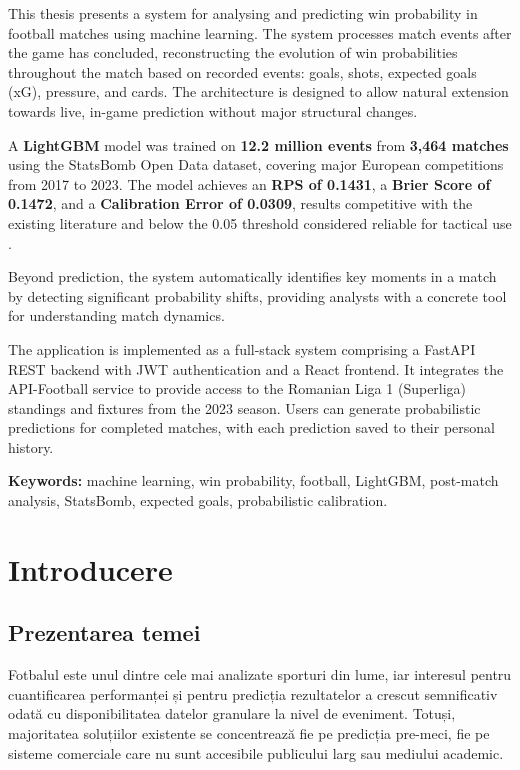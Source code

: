 This thesis presents a system for analysing and predicting win probability
in football matches using machine learning. The system processes match events
after the game has concluded, reconstructing the evolution of win probabilities
throughout the match based on recorded events: goals, shots, expected goals
(xG), pressure, and cards. The architecture is designed to allow natural
extension towards live, in-game prediction without major structural changes.

A \textbf{LightGBM} model was trained on \textbf{12.2 million events} from
\textbf{3,464 matches} using the StatsBomb Open Data dataset, covering major
European competitions from 2017 to 2023. The model achieves an
\textbf{RPS of 0.1431}, a \textbf{Brier Score of 0.1472}, and a
\textbf{Calibration Error of 0.0309}, results competitive with the
existing literature and below the 0.05 threshold considered reliable for
tactical use \cite{Robberechts2019}.

Beyond prediction, the system automatically identifies key moments in a
match by detecting significant probability shifts, providing analysts with
a concrete tool for understanding match dynamics.

The application is implemented as a full-stack system comprising a FastAPI
REST backend with JWT authentication and a React frontend. It integrates
the API-Football service to provide access to the Romanian Liga 1 (Superliga)
standings and fixtures from the 2023 season. Users can generate probabilistic
predictions for completed matches, with each prediction saved to their
personal history.

\bigskip
\noindent\textbf{Keywords:} machine learning, win probability, football,
LightGBM, post-match analysis, StatsBomb, expected goals,
probabilistic calibration.

\chapter*{Introducere}
\label{intro}

\section*{Prezentarea temei}

Fotbalul este unul dintre cele mai analizate sporturi din lume, iar
interesul pentru cuantificarea performanței și pentru predicția
rezultatelor a crescut semnificativ odată cu disponibilitatea datelor
granulare la nivel de eveniment. Totuși, majoritatea soluțiilor
existente se concentrează fie pe predicția pre-meci, fie pe sisteme
comerciale care nu sunt accesibile publicului larg sau mediului academic.

